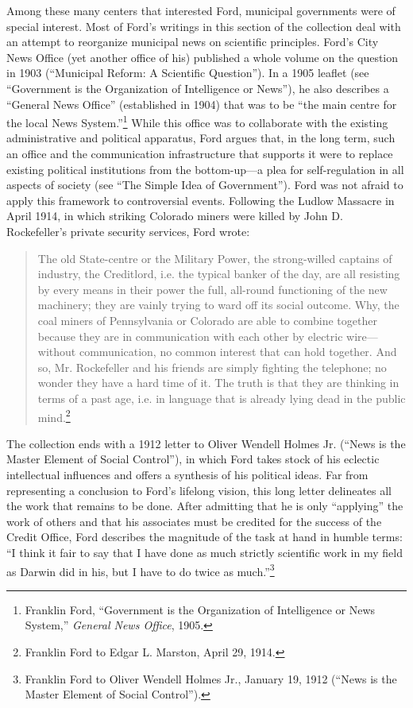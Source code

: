 \documentclass[openany,nobib]{tufte-book}
\begin{document}
Among these many centers that interested Ford, municipal governments
were of special interest. Most of Ford's writings in this section of the
collection deal with an attempt to reorganize municipal news on
scientific principles. Ford's City News Office (yet another office of
his) published a whole volume on the question in 1903 (``Municipal
Reform: A Scientific Question''). In a 1905 leaflet (see ``Government is
the Organization of Intelligence or News''), he also describes a
``General News Office'' (established in 1904) that was to be ``the main
centre for the local News System.''\footnote{Franklin Ford, ``Government
  is the Organization of Intelligence or News System,'' \emph{General
  News Office}, 1905.} While this office was to collaborate with the
existing administrative and political apparatus, Ford argues that, in
the long term, such an office and the communication infrastructure that
supports it were to replace existing political institutions from the
bottom-up---a plea for self-regulation in all aspects of society (see
``The Simple Idea of Government''). Ford was not afraid to apply this
framework to controversial events. Following the Ludlow Massacre in
April 1914, in which striking Colorado miners were killed by John D.
Rockefeller's private security services, Ford wrote:

\begin{quote}
The old State-centre or the Military Power, the strong-willed captains
of industry, the Creditlord, i.e. the typical banker of the day, are all
resisting by every means in their power the full, all-round functioning
of the new machinery; they are vainly trying to ward off its social
outcome. Why, the coal miners of Pennsylvania or Colorado are able to
combine together because they are in communication with each other by
electric wire---without communication, no common interest that can hold
together. And so, Mr. Rockefeller and his friends are simply fighting
the telephone; no wonder they have a hard time of it. The truth is that
they are thinking in terms of a past age, i.e. in language that is
already lying dead in the public mind.\footnote{Franklin Ford to Edgar
  L. Marston, April 29, 1914.}
\end{quote}

The collection ends with a 1912 letter to Oliver Wendell Holmes Jr.
(``News is the Master Element of Social Control''), in which Ford takes
stock of his eclectic intellectual influences and offers a synthesis of
his political ideas. Far from representing a conclusion to Ford's
lifelong vision, this long letter delineates all the work that remains
to be done. After admitting that he is only ``applying'' the work of
others and that his associates must be credited for the success of the
Credit Office, Ford describes the magnitude of the task at hand in
humble terms: ``I think it fair to say that I have done as much strictly
scientific work in my field as Darwin did in his, but I have to do twice
as much.''\footnote{Franklin Ford to Oliver Wendell Holmes Jr., January
  19, 1912 (``News is the Master Element of Social Control'').}
\end{document}
